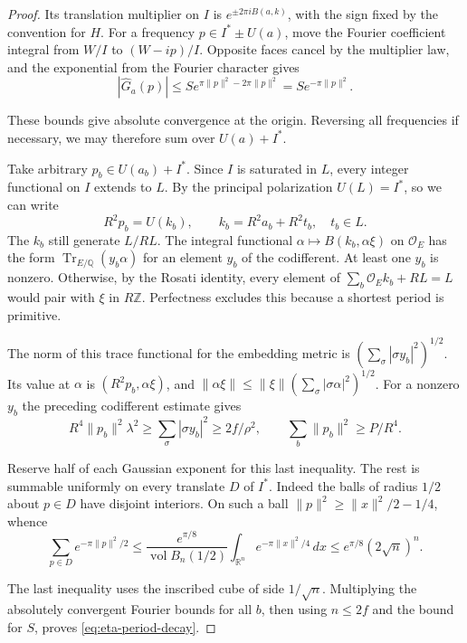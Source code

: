 \begin{proof}
Its translation multiplier on \(I\) is \(e^{\pm2\pi iB(a,k)}\),
with the sign fixed by the convention for \(H\). For a frequency
\(p\in I^*\pm U(a)\), move the Fourier coefficient integral from
\(W/I\) to \((W-ip)/I\). Opposite faces cancel by the multiplier
law, and the exponential from the Fourier character gives
\[
 |\widehat G_a(p)|\le S e^{\pi\|p\|^2-2\pi\|p\|^2}
                    = S e^{-\pi\|p\|^2}.
\]

These bounds give absolute convergence at the origin. Reversing all
frequencies if necessary, we may therefore sum over \(U(a)+I^*\).

Take arbitrary \(p_b\in U(a_b)+I^*\). Since \(I\) is saturated in
\(L\), every integer functional on \(I\) extends to \(L\). By the
principal polarization \(U(L)=I^*\), so we can write
\[
 R^2p_b=U(k_b),\qquad k_b=R^2a_b+R^2t_b,\quad t_b\in L .
\]
The \(k_b\) still generate \(L/RL\). The integral functional
\(\alpha\mapsto B(k_b,\alpha\xi)\) on \(\mathcal O_E\) has the
form \(\operatorname{Tr}_{E/\mathbb Q}(y_b\alpha)\) for an element
\(y_b\) of the codifferent. At least one \(y_b\) is nonzero.
Otherwise, by the Rosati identity, every element of
\(\sum_b\mathcal O_E k_b+RL=L\) would pair with \(\xi\) in
\(R\mathbb Z\). Perfectness excludes this because a shortest
period is primitive.

The norm of this trace functional for the embedding metric is
\((\sum_\sigma|\sigma y_b|^2)^{1/2}\). Its value at \(\alpha\) is
\((R^2p_b,\alpha\xi)\), and
\(\|\alpha\xi\|\le\|\xi\|(\sum_\sigma|\sigma\alpha|^2)^{1/2}\).
For a nonzero \(y_b\) the preceding codifferent estimate gives
\[
 R^4\|p_b\|^2\lambda^2\ge
 \sum_\sigma|\sigma y_b|^2\ge 2f/\rho^2,
 \qquad \sum_b\|p_b\|^2\ge P/R^4 .
\]

Reserve half of each Gaussian exponent for this last inequality.
The rest is summable uniformly on every translate \(D\) of \(I^*\).
Indeed the balls of radius \(1/2\) about \(p\in D\) have disjoint
interiors. On such a ball \(\|p\|^2\ge\|x\|^2/2-1/4\), whence
\[
 \sum_{p\in D} e^{-\pi\|p\|^2/2}
 \le \frac{e^{\pi/8}}{\operatorname{vol}B_n(1/2)}
                  \int_{\mathbb R^n}e^{-\pi\|x\|^2/4}\,dx
 \le e^{\pi/8}(2\sqrt n)^n .
\]

The last inequality uses the inscribed cube of side \(1/\sqrt n\).
Multiplying the absolutely convergent Fourier bounds for all
\(b\), then using \(n\le2f\) and the bound for \(S\), proves
\eqref{eq:eta-period-decay}.
\end{proof}


